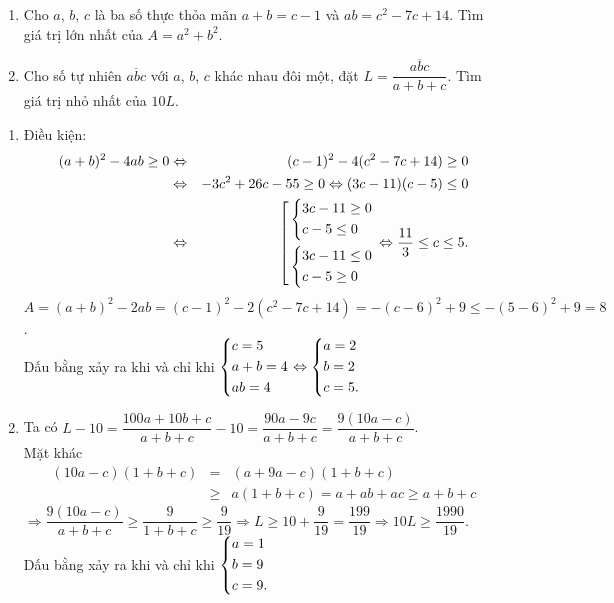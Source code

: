\begin{ex}%
    \begin{enumerate}
        \item Cho $a$, $b$, $c$ là ba số thực thỏa mãn $a+b=c-1$ và $ab=c^2-7c+14$. Tìm giá trị lớn nhất của $A=a^2+b^2$.
        \item Cho số tự nhiên $\overline{abc}$ với $a$, $b$, $c$ khác nhau đôi một, đặt $L=\dfrac{\overline{abc}}{a+b+c}$. Tìm giá trị nhỏ nhất của $10L$.
    \end{enumerate}
\loigiai
    {
  		\begin{enumerate}
  			\item Điều kiện: 
  			\begin{eqnarray*}
  				(a+b)^2-4ab\ge 0 &\Leftrightarrow& (c-1)^2-4(c^2-7c+14)\ge 0\\
  				&\Leftrightarrow& -3c^2+26c-55\ge 0
  				\Leftrightarrow (3c-11)(c-5)\le 0\\
  				&\Leftrightarrow& \left[\begin{aligned}&\left\{\begin{aligned}&3c-11\ge 0\\&c-5\le 0\end{aligned}\right.\\&\left\{\begin{aligned}&3c-11\le 0\\&c-5\ge 0\end{aligned}\right.\end{aligned}\right.
  				\Leftrightarrow \dfrac{11}{3}\le c\le 5. 
  			\end{eqnarray*}
  			$A=(a+b)^2-2ab=(c-1)^2-2(c^2-7c+14)=-(c-6)^2+9\le -(5-6)^2+9=8$.\\
  			Dấu bằng xảy ra khi và chỉ khi $\left\{\begin{aligned}&c=5\\&a+b=4\\&ab=4\end{aligned}\right.\Leftrightarrow \left\{\begin{aligned}&a=2\\&b=2\\&c=5.\end{aligned}\right.$
  			\item Ta có $L-10=\dfrac{100a+10b+c}{a+b+c}-10=\dfrac{90a-9c}{a+b+c}=\dfrac{9(10a-c)}{a+b+c}$.\\
  			Mặt khác 
  			\begin{eqnarray*}
  				(10a-c)(1+b+c)&=&(a+9a-c)(1+b+c)\\
  				&\ge & a(1+b+c)=a+ab+ac\ge a+b+c
  			\end{eqnarray*}
  		$\Rightarrow \dfrac{9(10a-c)}{a+b+c}\ge \dfrac{9}{1+b+c}\ge \dfrac{9}{19}\Rightarrow L\ge 10+\dfrac{9}{19}=\dfrac{199}{19}\Rightarrow 10L\ge \dfrac{1990}{19}.$\\
 		Dấu bằng xảy ra khi và chỉ khi $\left\{\begin{aligned}&a=1\\&b=9\\&c=9.\end{aligned}\right.$
  		\end{enumerate}
    }
\end{ex}

